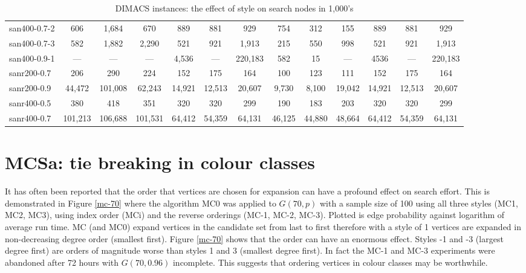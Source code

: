\documentclass{l4proj}
\begin{document}
\begin{table}
\begin{center}
\begin{tiny}
\begin{tabular}{|l|c c c|c c c|c c c|c c c|}
san400-0.7-2 & 606 & 1,684 & 670 & 889 & 881 & 929 & 754 & 312 & 155 & 889 & 881 & 929 \\ 
san400-0.7-3 & 582 & 1,882 & 2,290 & 521 & 921 & 1,913 & 215 & 550 & 998 & 521 & 921 & 1,913 \\ 
san400-0.9-1 & --- & --- & --- & 4,536 & --- & 220,183 & 582 & 15 & --- & 4536 & --- & 220,183 \\ 
sanr200-0.7 & 206 & 290 & 224 & 152 & 175 & 164 & 100 & 123 & 111 & 152 & 175 & 164 \\ 
sanr200-0.9 & 44,472 & 101,008 & 62,243 & 14,921 & 12,513 & 20,607 & 9,730 & 8,100 & 19,042 & 14,921 & 12,513 & 20,607 \\ 
sanr400-0.5 & 380 & 418 & 351 & 320 & 320 & 299 & 190 & 183 & 203 & 320 & 320 & 299 \\ 
sanr400-0.7 & 101,213 & 106,688 & 101,531 & 64,412 & 54,359 & 64,131 & 46,125 & 44,880 & 48,664 & 64,412 & 54,359 & 64,131 \\ \hline
\end{tabular}
\end{tiny}
\end{center}
\caption{DIMACS instances: the effect of style on search nodes in 1,000's}
\label{tabNodes}
\end{table}


\section{MCSa: tie breaking in colour classes}
It has often been reported that the order that vertices are chosen for expansion can have a profound effect on search effort.
This is demonstrated in Figure \ref{mc-70} where the algorithm MC0 was applied to $G(70,p)$ with a sample
size of 100 using all three styles (MC1, MC2, MC3), using index order (MCi) and the reverse orderings (MC-1, MC-2, MC-3).
Plotted is edge probability against logarithm of average run time. MC (and MC0) expand vertices in the candidate
set from last to first therefore with a style of 1 vertices are expanded in non-decreasing degree order (smallest first).
Figure \ref{mc-70} shows that the order can have an enormous effect. Styles -1 and -3 (largest degree first) are orders of magnitude
worse than styles 1 and 3 (smallest degree first). In fact the MC-1 and MC-3 experiments were abandoned after 72 hours with
$G(70,0.96)$ incomplete. This suggests that ordering vertices in colour classes may be worthwhile.
\end{document}
